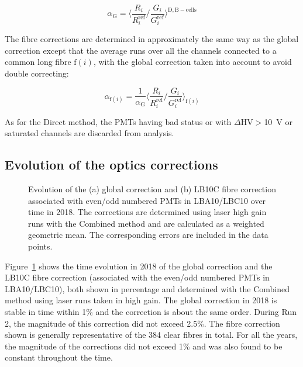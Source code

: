 \begin{equation}
    \alpha_{\mathrm{G}} = \bigg\langle \frac{R_i}{R_i^{\mathrm{ref}}} \Big/ \frac{G_i}{G_i^{\mathrm{ref}}} \bigg\rangle^{\mathrm{D,B-cells}}
    \label{eq:global_combined}
\end{equation}

The fibre corrections are determined in approximately the same way as the global correction except that the average runs over all the channels connected to a common long fibre $\mathrm{f}(i)$, with the global correction taken into account to avoid double correcting:

\begin{equation}
    \alpha_{\mathrm{f}(i)} = \frac{1}{\alpha_{\mathrm{G}}} \bigg\langle \frac{R_i}{R_i^{\mathrm{ref}}} \Big/ \frac{G_i}{G_i^{\mathrm{ref}}} \bigg\rangle_{\mathrm{f}(i)}
    \label{eq:fibre_combined}
\end{equation}

As for the Direct method, the PMTs having bad status or with $\Delta \mathrm{HV}>$10~V or saturated channels are discarded from analysis.


\subsection{Evolution of the optics corrections}

\begin{figure}[htbp]
\centering
{}
\caption{Evolution of the (a) global correction and (b) LB10C fibre correction associated with even/odd numbered PMTs in LBA10/LBC10 over time in 2018. The corrections are determined using laser high gain runs with the Combined method and are calculated as a weighted geometric mean. The corresponding errors are included in the data points.}
\label{fig:optics_correction_2018}
\end{figure}


Figure~\ref{fig:optics_correction_2018} shows the time evolution in 2018 of the global correction and the LB10C fibre correction (associated with the even/odd numbered PMTs in LBA10/LBC10), both shown in percentage and determined with the Combined method using laser runs taken in high gain. The global correction in 2018 is stable in time within 1\% and the correction is about the same order. During Run 2, the magnitude of this correction did not exceed 2.5\%. The fibre correction shown is generally representative of the 384 clear fibres in total. For all the years, the magnitude of the corrections did not exceed 1\% and was also found to be constant throughout the time.

